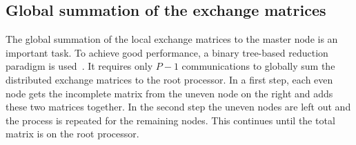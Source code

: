 \documentclass[prl,preprint,doublespace]{revtex4} %
\newcommand{\commentoutA}[1]{}
\begin{document}
\commentoutA{

\begin{figure}[htbp]
  \centering
 \caption{\protect
   Example of a horizontal and vertical recursive decomposition for 16 processors.
 }\label{fig:part2D}
 \setlength{\unitlength}{5cm}
 \begin{picture}(1,1)
   \put(0,0){\line(0,1){1}}
   \put(0,0){\line(1,0){1}}
   \put(1,0){\line(0,1){1}}
   \put(0,1){\line(1,0){1}}
   \multiput(0   ,0.2 )(0.05,0   ){20} {\line(1,0){0.025}}
   \multiput(0.2 ,0   )(0   ,0.05){ 4} {\line(0,1){0.025}}
   \multiput(0.45,0   )(0   ,0.05){ 4} {\line(0,1){0.025}}
   \multiput(0.9 ,0   )(0   ,0.05){ 4} {\line(0,1){0.025}}
   \multiput(0   ,0.45)(0.05,0   ){20} {\line(1,0){0.025}}
   \multiput(0.25,0.2 )(0   ,0.05){ 5} {\line(0,1){0.025}}
   \multiput(0.6 ,0.2 )(0   ,0.05){ 5} {\line(0,1){0.025}}
   \multiput(0.8 ,0.2 )(0   ,0.05){ 5} {\line(0,1){0.025}}
   \multiput(0   ,0.85)(0.05,0   ){20} {\line(1,0){0.025}}
   \multiput(0.23,0.45)(0   ,0.05){ 8} {\line(0,1){0.025}}
   \multiput(0.43,0.45)(0   ,0.05){ 8} {\line(0,1){0.025}}
   \multiput(0.70,0.45)(0   ,0.05){ 8} {\line(0,1){0.025}}
   \multiput(0.15,0.85)(0   ,0.05){ 3} {\line(0,1){0.025}}
   \multiput(0.40,0.85)(0   ,0.05){ 3} {\line(0,1){0.025}}
   \multiput(0.75,0.85)(0   ,0.05){ 3} {\line(0,1){0.025}}
 \end{picture}
\end{figure}

}%

\subsection{Global summation of the exchange matrices}
 The global summation of the local exchange matrices to the master node is
 an important task. To achieve good performance, a binary tree-based 
 reduction paradigm is used~\cite{GFox88,RGeijn91}. It requires 
 only $P-1$ communications to globally
 sum the distributed exchange matrices to the root processor.
 In a first step, each even node gets the incomplete matrix from the 
 uneven node on the right and adds these two matrices together. 
 In the second step the uneven nodes are left out and the process 
 is repeated for the remaining nodes. This continues until the total 
 matrix is on the root processor. 
\end{document}
